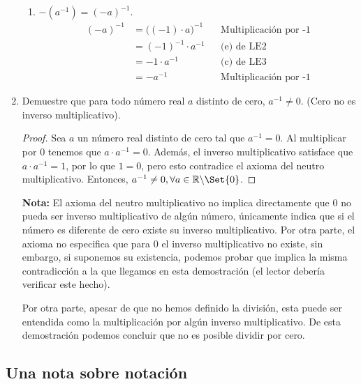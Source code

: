 \documentclass[11pt]{article}
\newcommand{\R}{\mathbb{R}}
\let\set\Set
\begin{document}
\begin{enumerate}[label=\alph*)]
\begin{enumerate}[label=\roman*)]
        \item $-(a^{-1})=(-a)^{-1}$. \vspace{-1em} \begin{align*}
            (-a)^{-1} &= \bigl((-1)\cdot a\bigr)^{-1} && \text{Multiplicación por -1}\\
            &= (-1)^{-1} \cdot a^{-1} && \text{(e) de LE2}\\
            &= -1 \cdot a^{-1} && \text{(c) de LE3}\\
            &= -a^{-1} && \text{Multiplicación por -1}
        \end{align*}

    \end{enumerate}%

    \item Demuestre que para todo número real $a$ distinto de cero, $a^{-1}\neq 0$. (Cero no es inverso multiplicativo).
    
    \vspace{-1em}\begin{proof} 
        Sea $a$ un número real distinto de cero tal que $a^{-1}=0$. Al multiplicar por $0$ tenemos que $a\cdot a^{-1}=0$. Además, el inverso multiplicativo satisface que $a\cdot a^{-1}=1$, por lo que $1=0$, pero esto contradice el axioma del neutro multiplicativo. Entonces, $a^{-1}\neq 0, \forall a\in \R\backslash \set{0}$.    
    \end{proof} \vspace{-1em}

    \textbf{Nota:} El axioma del neutro multiplicativo no implica directamente que $0$ no pueda ser inverso multiplicativo de algún número, únicamente indica que si el número es diferente de cero existe su inverso multiplicativo. Por otra parte, el axioma no especifica que para 0 el inverso multiplicativo no existe, sin embargo, si suponemos su existencia, podemos probar que implica la misma contradicción a la que llegamos en esta demostración (el lector debería verificar este hecho).

    Por otra parte, apesar de que no hemos definido la división, esta puede ser entendida como la multiplicación por algún inverso multiplicativo. De esta demostración podemos concluir que no es posible dividir por cero.

\end{enumerate}

\pagebreak

    \subsection*{Una nota sobre notación}
\end{document}
